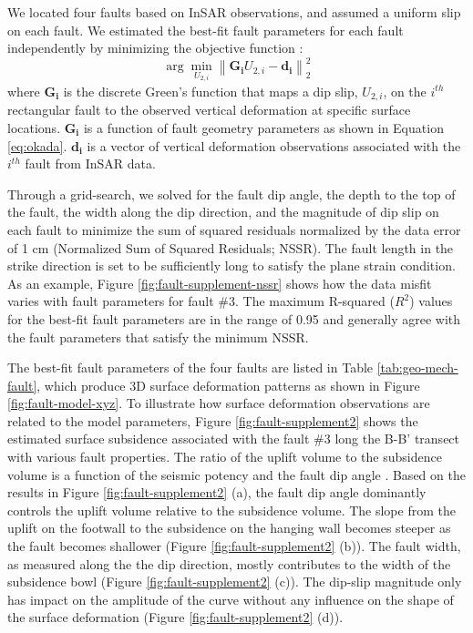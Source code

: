 \documentclass{utexasthesis}
\begin{document}
We located four faults based on InSAR observations, and assumed a uniform slip on each fault. We estimated the best-fit fault parameters for each fault independently by minimizing the objective function \cite{Du1992}:
\begin{equation}
	\arg \min_{U_{2,i}} \left \| \mathbf{G_i}U_{2,i}-\mathbf{d_i} \right \|^2_{2}  
	\label{eq:model-obj-1}
\end{equation}	  	
where $\mathbf{G_i}$ is the discrete Green’s function that maps a dip slip, $U_{2,i}$, on the $i^{th}$ rectangular fault to the observed vertical deformation at specific surface locations.  $\mathbf{G_i}$ is a function of fault geometry parameters as shown in Equation \eqref{eq:okada}. $\mathbf{d_i}$ is a vector of vertical deformation observations associated with the $i^{th}$ fault from InSAR data.

Through a grid-search, we solved for the fault dip angle, the depth to the top of the fault, the width along the dip direction, and the magnitude of dip slip on each fault to minimize the sum of squared residuals normalized by the data error of 1 cm (Normalized Sum of Squared Residuals; NSSR). The fault length in the strike direction is set to be sufficiently long to satisfy the plane strain condition. As an example, Figure \ref{fig:fault-supplement-nssr} shows how the data misfit varies with fault parameters for fault \#3. The maximum R-squared ($R^2$) values for the best-fit fault parameters are in the range of 0.95 and generally agree with the fault parameters that satisfy the minimum NSSR. 

The best-fit fault parameters of the four faults are listed in Table \ref{tab:geo-mech-fault}, which produce 3D surface deformation patterns as shown in Figure \ref{fig:fault-model-xyz}. To illustrate how surface deformation observations are related to the model parameters, Figure \ref{fig:fault-supplement2} shows the estimated surface subsidence associated with the fault \#3 long the B-B' transect with various fault properties. The ratio of the uplift volume to the subsidence volume is a function of the seismic potency and the fault dip angle \cite{Segall2019integrated}. Based on the results in Figure \ref{fig:fault-supplement2} (a), the fault dip angle dominantly controls the uplift volume relative to the subsidence volume. The slope from the uplift on the footwall to the subsidence on the hanging wall becomes steeper as the fault becomes shallower (Figure \ref{fig:fault-supplement2} (b)). The fault width, as measured along the the dip direction, mostly contributes to the width of the subsidence bowl (Figure \ref{fig:fault-supplement2} (c)).  The dip-slip magnitude only has impact on the amplitude of the curve without any influence on the shape of the surface deformation (Figure \ref{fig:fault-supplement2} (d)).
\end{document}
